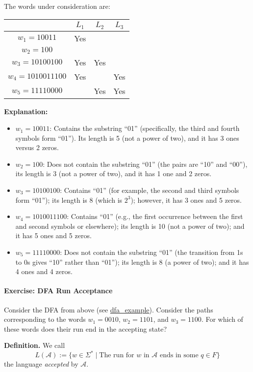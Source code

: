 \documentclass{article}
\theoremstyle{theorem}
\theoremstyle{definition}
\theoremstyle{remark}
\begin{document}
The words under consideration are:
\begin{center}
\begin{tabular}{c|c|c|c}
 & \(L_1\) & \(L_2\) & \(L_3\) \\
\hline
\(w_1 = 10011\) & Yes &  &  \\
\(w_2 = 100\) &  &  &  \\
\(w_3 = 10100100\) & Yes & Yes &  \\
\(w_4 = 1010011100\) & Yes &  & Yes \\
\(w_5 = 11110000\) &  & Yes & Yes \\
\end{tabular}
\end{center}

\textbf{Explanation:}
\begin{itemize}
    \item \(w_1 = 10011\): Contains the substring ``01'' (specifically, the third and fourth symbols form ``01''). Its length is 5 (not a power of two), and it has 3 ones versus 2 zeros.
    \item \(w_2 = 100\): Does not contain the substring ``01'' (the pairs are ``10'' and ``00''), its length is 3 (not a power of two), and it has 1 one and 2 zeros.
    \item \(w_3 = 10100100\): Contains ``01'' (for example, the second and third symbols form ``01''); its length is 8 (which is \(2^3\)); however, it has 3 ones and 5 zeros.
    \item \(w_4 = 1010011100\): Contains ``01'' (e.g., the first occurrence between the first and second symbols or elsewhere); its length is 10 (not a power of two); and it has 5 ones and 5 zeros.
    \item \(w_5 = 11110000\): Does not contain the substring ``01'' (the transition from 1s to 0s gives ``10'' rather than ``01''); its length is 8 (a power of two); and it has 4 ones and 4 zeros.
\end{itemize}

\paragraph*{Exercise: DFA Run Acceptance}

Consider the DFA from above (see \href{https://hackmd.io/_uploads/ByLSmw_tyl.jpg}{dfa\_example}). Consider the paths corresponding to the words \(w_1 = 0010\), \(w_2 = 1101\), and \(w_3 = 1100\). For which of these words does their run end in the accepting state?

\textbf{Definition.} We call
\[
L(\mathcal{A}) := \{w \in \Sigma^* \; | \; \text{The run for \(w\) in \(\mathcal{A}\) ends in some \(q \in F\)} \}
\]
the language \textit{accepted} by \(\mathcal{A}\).
\end{document}
